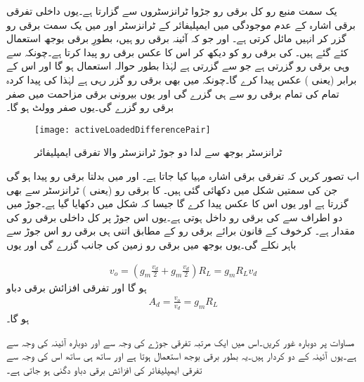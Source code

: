 یک سمت  منبع رو کل  برقی رو جڑوا ٹرانزسٹروں سے گزارتا ہے۔یوں داخلی تفرقی برقی اشارہ کے عدم موجودگی میں ایمپلیفائر کے ٹرانزسٹر   اور  میں یک سمت برقی رو  گزر کر انہیں مائل کرتی ہے۔  اور  جو کہ آئینہ برقی رو ہیں، بطورِ برقی بوجھ استعمال کئے گئے ہیں۔  کی برقی رو کو دیکھ کر  اس کا عکس برقی رو پیدا کرتا ہے۔چونکہ  سے وہی برقی رو گزرتی ہے جو  سے گزرتی ہے لہٰذا  بطور حوالہ استعمال ہو گا اور   اس کے برابر (یعنی   ) عکس پیدا کرے گا۔چونکہ   میں بھی  برقی رو گزر رہی ہے لہٰذا  کی پیدا کردہ تمام کی تمام برقی رو  سے ہی گزرے گی اور یوں بیرونی برقی مزاحمت  میں صفر برقی رو گزرے گی۔یوں  صفر وولٹ ہو گا۔
\begin{figure}
\centering
\texttt{[image: activeLoadedDifferencePair]}
\caption{ٹرانزسٹر بوجھ سے لدا دو جوڑ ٹرانزسٹر والا تفرقی ایمپلیفائر}
\label{شکل_ٹرانزسٹر_بار_سے_لدھا_تفرقی_جوڑا}
\end{figure}
اب تصور کریں کہ تفرقی برقی اشارہ  مہیا کیا جاتا ہے۔  اور   میں بدلتا برقی رو  پیدا ہو گی جن کی سمتیں شکل میں دکھائی گئی ہیں۔  کا برقی رو (یعنی  ) ٹرانزسٹر   سے بھی گزرتا ہے اور یوں   اس کا عکس پیدا کرے گا جیسا کہ شکل میں دکھایا گیا ہے۔جوڑ  میں دو اطراف سے   کی برقی رو داخل ہوتی ہے۔یوں اس جوڑ پر کل داخلی برقی رو کی مقدار   ہے۔ کرخوف کے قانون برائے برقی رو کے مطابق اتنی ہی برقی رو اس جوڑ سے باہر نکلے گی۔یوں بوجھ  میں  برقی رو زمین کی جانب گزرے گی اور یوں

\begin{align} \label{مساوات_تفرقی_ٹرانزسٹر_سے_لدھے_تفرقی_جوڑے_کا_مخارج}
v_o=\left(g_m \frac{v_d}{2}+g_m \frac{v_d}{2} \right )R_L=g_m R_L v_d
\end{align}
ہو گا اور تفرقی افزائش برقی دباو
\begin{align} \label{مساوات_تفرقی_ٹرانزسٹر_لدھا_تفرقی_افزائش}
A_d=\frac{v_o}{v_d}=g_m R_L
\end{align}
ہو گا۔

مساوات   پر دوبارہ غور کریں۔اس میں   ایک مرتبہ تفرقی جوڑے کی وجہ سے اور دوبارہ آئینہ کی وجہ سے ہے۔یوں آئینہ کے دو کردار ہیں۔یہ بطور برقی بوجھ استعمال ہوتا ہے اور ساتھ ہی ساتھ اس کی وجہ سے تفرقی ایمپلیفائر کی افزائش برقی دباو  دگنی ہو جاتی ہے۔

